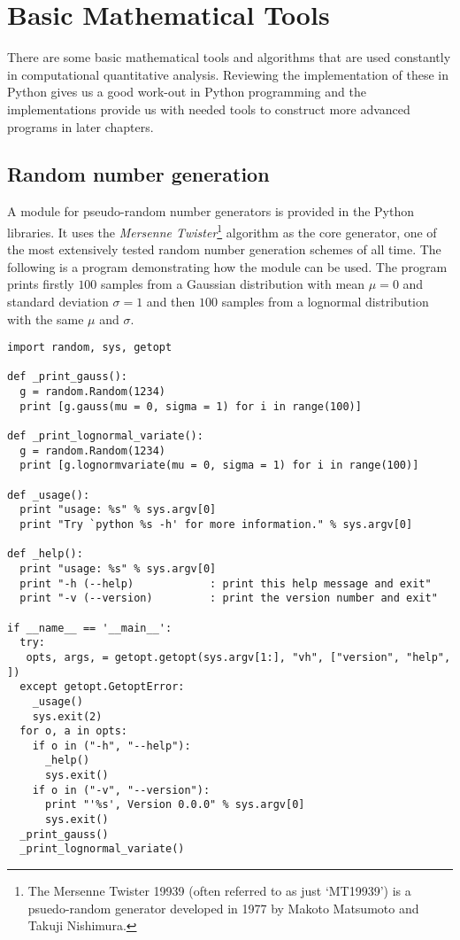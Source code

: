 \chapter{Basic Mathematical Tools}\label{ch:basic-mathematical-tools}

There are some basic mathematical tools and algorithms that are used
constantly in computational quantitative analysis. Reviewing the
implementation of these in Python gives us a good work-out in Python
programming and the implementations provide us with needed tools to
construct more advanced programs in later chapters.

\section{Random number generation}

A module for pseudo-random number generators is provided in the Python
libraries. It uses the \emph{Mersenne Twister}\footnote{The Mersenne
Twister 19939 (often referred to as just `MT19939') is a psuedo-random
generator developed in 1977 by Makoto Matsumoto and Takuji Nishimura.}
algorithm as the core generator, one of the most extensively tested
random number generation schemes of all time. The following is a program
demonstrating how the module can be used. The program prints firstly
$100$ samples from a Gaussian distribution with mean $\mu = 0$ and
standard deviation $\sigma=1$ and then $100$ samples from a lognormal
distribution with the same $\mu$ and $\sigma$.
\begin{verbatim}
import random, sys, getopt

def _print_gauss():
  g = random.Random(1234)
  print [g.gauss(mu = 0, sigma = 1) for i in range(100)]

def _print_lognormal_variate():
  g = random.Random(1234)
  print [g.lognormvariate(mu = 0, sigma = 1) for i in range(100)]

def _usage():
  print "usage: %s" % sys.argv[0]
  print "Try `python %s -h' for more information." % sys.argv[0]

def _help():
  print "usage: %s" % sys.argv[0]
  print "-h (--help)            : print this help message and exit"
  print "-v (--version)         : print the version number and exit"

if __name__ == '__main__':
  try:
   opts, args, = getopt.getopt(sys.argv[1:], "vh", ["version", "help", ])
  except getopt.GetoptError:
    _usage()
    sys.exit(2)
  for o, a in opts:
    if o in ("-h", "--help"):
      _help()
      sys.exit()
    if o in ("-v", "--version"):
      print "'%s', Version 0.0.0" % sys.argv[0]
      sys.exit()
  _print_gauss()
  _print_lognormal_variate()
\end{verbatim}

